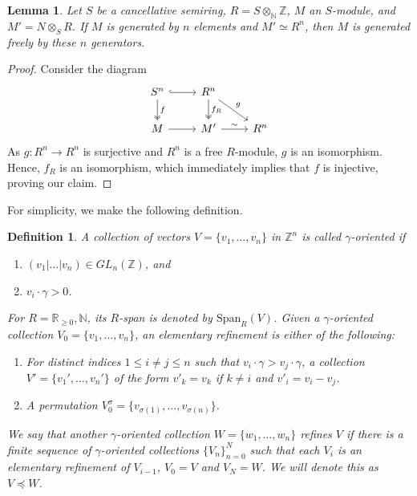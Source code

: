 \documentclass[notitlepage, 10pt]{article}
\theoremstyle{defin}
\newtheorem{defn}{Definition}
\theoremstyle{theo}
\newtheorem{lem}{Lemma}[defn]
\theoremstyle{rema}
\newcommand{\R}{\mathbb{R}}
\newcommand{\N}{\mathbb{N}}
\newcommand{\Z}{\mathbb{Z}}
\begin{document}
\begin{lem}
    \label{lem8.3}
    Let $S$ be a cancellative semiring, $R=S\otimes_\N\Z$, $M$ an $S$-module, and $M' = N\otimes_S R$. If $M$ is generated by $n$ elements and $M'\simeq R^n$, then $M$ is generated freely by these $n$ generators.
\end{lem}

\begin{proof}
    Consider the diagram
    \[\begin{tikzcd}
        S^n \arrow[d, two heads, "f"]\arrow[r, hook] & R^n \arrow[d, two heads, "f_R"] \arrow[dr, "g"] & \\
        M \arrow[r] & M' \arrow[r, "\sim"] & R^n
    \end{tikzcd}\]
    As $g:R^n \to R^n$ is surjective and $R^n$ is a free $R$-module, $g$ is an isomorphism. Hence, $f_R$ is an isomorphism, which immediately implies that $f$ is injective, proving our claim.
\end{proof}

For simplicity, we make the following definition.

\begin{defn}
    A collection of vectors $V=\{v_1,\ldots, v_n\}$ in $\Z^n$ is called \textit{$\gamma$-oriented} if 
    \begin{enumerate}
        \item $(v_1|\ldots|v_n) \in GL_n(\Z)$, and
        \item $v_i\cdot \gamma >0$.
    \end{enumerate}
    
    For $R=\R_{\geq 0}, \N$, its $R$-span is denoted by $\mathrm{Span}_R(V)$. Given a $\gamma$-oriented collection $V_0 = \{v_1,\ldots,v_n\}$, an \textit{elementary refinement} is either of the following:
    \begin{enumerate}
        \item For distinct indices $1\leq i \neq j \leq n$ such that $v_i\cdot \gamma > v_j\cdot \gamma$, a collection $V'=\{v_1',\ldots, v_n'\}$ of the form $v'_k =v_k $ if $k\neq i$ and $v'_i = v_i - v_j$.
        \item A permutation $V^\sigma_0 = \{v_{\sigma(1)},\ldots, v_{\sigma(n)}\}$.
        \end{enumerate}
    
    We say that another $\gamma$-oriented collection $W=\{w_1,\ldots,w_n\}$ \textit{refines} $V$ if there is a finite sequence of $\gamma$-oriented collections $\{V_n\}_{n=0}^{N}$ such that each $V_i$ is an elementary refinement of $V_{i-1}$, $V_0=V$ and $V_N=W$. We will denote this as $V\preceq W$.
\end{defn}
\end{document}
